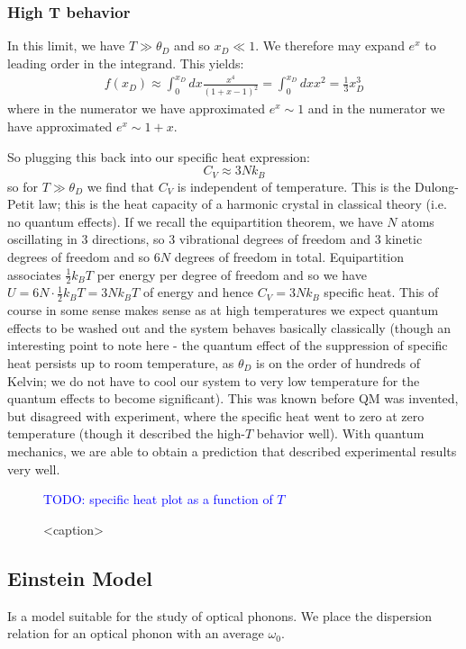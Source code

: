 \subsubsection{High T behavior}
In this limit, we have $T \gg \theta_D$ and so $x_D \ll 1$. We therefore may expand $e^x$ to leading order in the integrand. This yields:
\begin{align*}
    f(x_D) \approx \int_0^{x_D}dx \frac{x^4}{(1+x-1)^2} = \int_0^{x_D} dx x^2 = \frac{1}{3}x_D^3
\end{align*}
where in the numerator we have approximated $e^x \sim 1$ and in the numerator we have approximated $e^x \sim 1 + x$.

So plugging this back into our specific heat expression:
\begin{equation}
    C_V \approx 3Nk_B
\end{equation}
so for $T \gg \theta_D$ we find that $C_V$ is independent of temperature. This is the Dulong-Petit law; this is the heat capacity of a harmonic crystal in classical theory (i.e. no quantum effects). If we recall the equipartition theorem, we have $N$ atoms oscillating in $3$ directions, so $3$ vibrational degrees of freedom and $3$ kinetic degrees of freedom and so $6N$ degrees of freedom in total. Equipartition associates $\frac{1}{2}k_B T$ per energy per degree of freedom and so we have $U = 6N \cdot \frac{1}{2}k_B T = 3Nk_B T$ of energy and hence $C_V = 3Nk_B$ specific heat. This of course in some sense makes sense as at high temperatures we expect quantum effects to be washed out and the system behaves basically classically (though an interesting point to note here - the quantum effect of the suppression of specific heat persists up to room temperature, as $\theta_D$ is on the order of hundreds of Kelvin; we do not have to cool our system to very low temperature for the quantum effects to become significant). This was known before QM was invented, but disagreed with experiment, where the specific heat went to zero at zero temperature (though it described the high-$T$ behavior well). With quantum mechanics, we are able to obtain a prediction that described experimental results very well.

\begin{figure}[htbp]
    \centering
    \textcolor{blue}{TODO: specific heat plot as a function of $T$}
    \caption{<caption>}
    \label{<label>}
\end{figure}

\subsection{Einstein Model}
Is a model suitable for the study of optical phonons. We place the dispersion relation for an optical phonon with an average $\omega_0$.

